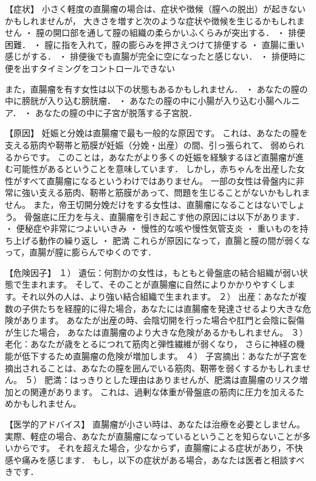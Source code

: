 【症状】
小さく軽度の直腸瘤の場合は、症状や徴候（膣への脱出）が起きないかもしれませんが，
大きさを増すと次のような症状や徴候を生じるかもしれません
・ 膣の開口部を通して膣の組織の柔らかいふくらみが突出する．
・ 排便困難．
・ 膣に指を入れて，膣の膨らみを押さえつけて排便する
・ 直腸に重い感じがする．
・ 排便後でも直腸が完全に空になったと感じない．
・ 排便時に便を出すタイミングをコントロールできない

また，直腸瘤を有す女性は以下の状態もあるかもしれません．
・ あなたの膣の中に膀胱が入り込む膀胱瘤．
・ あなたの膣の中に小腸が入り込む小腸ヘルニア．
・ あなたの膣の中に子宮が脱落する子宮脱．


【原因】
妊娠と分娩は直腸瘤で最も一般的な原因です。
これは、あなたの膣を支える筋肉や靭帯と筋膜が妊娠（分娩・出産）の間、引っ張られて、
弱められるからです。
このことは，あなたがより多くの妊娠を経験するほど直腸瘤が進む可能性があるということを意味しています．
しかし，赤ちゃんを出産した女性がすべて直腸瘤になるというわけではありません。
一部の女性は骨盤内に非常に強い支える筋肉、靭帯と筋膜があって、問題を生じることがないかもしれません。
また，帝王切開分娩だけをする女性は、直腸瘤になることはないでしょう。
骨盤底に圧力を与え、直腸瘤を引き起こす他の原因には以下があります．
・ 便秘症や非常につよいいきみ
・ 慢性的な咳や慢性気管支炎
・ 重いものを持ち上げる動作の繰り返し
・ 肥満
これらが原因になって，直腸と膣の間が弱くなって，直腸が膣に膨らんでゆくのです．

【危険因子】
１） 遺伝：何割かの女性は，もともと骨盤底の結合組織が弱い状態で生まれます。
そして、そのことが直腸瘤に自然によりかかりやすくします。それ以外の人は、より強い結合組織で生まれます。
２） 出産：あなたが複数の子供たちを経膣的に得た場合，あなたには直腸瘤を発達させるより大きな危険があります。
あなたが出産の時、会陰切開を行った場合や肛門と会陰に裂傷が生じた場合，
あなたは直腸瘤のより大きな危険があるかもしれません。
３） 老化：あなたが歳をとるにつれて筋肉と弾性繊維が弱くなり，
さらに神経の機能が低下するため直腸瘤の危険が増加します。
４） 子宮摘出：あなたが子宮を摘出されることは、あなたの膣を囲んでいる筋肉、靭帯を弱くするかもしれません。
５） 肥満：はっきりとした理由はありませんが、肥満は直腸瘤のリスク増加との関連があります。
これは、過剰な体重が骨盤底の筋肉に圧力を加えるためかもしれません。 

【医学的アドバイス】
直腸瘤が小さい時は、あなたは治療を必要としません。
実際、軽症の場合、あなたが直腸瘤になっているということを知らないことが多いからです。
それを超えた場合，少なからず，直腸瘤による症状があり，不快感や痛みを感じます．
もし，以下の症状がある場合，あなたは医者と相談すべきです．

